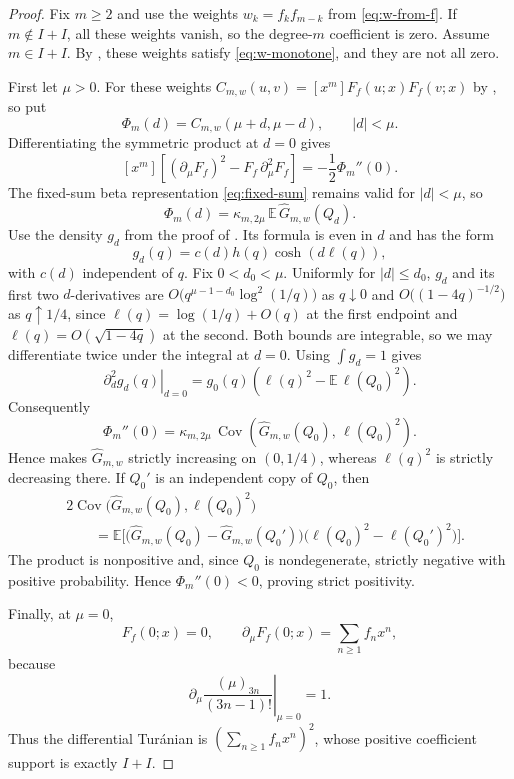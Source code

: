 \documentclass[11pt,a4paper]{amsart}
\numberwithin{equation}{section}
\theoremstyle{plain}
\theoremstyle{definition}
\newcommand{\E}{\mathbb E}
\begin{document}
\begin{proof}
Fix \(m\ge2\) and use the weights \(w_k=f_kf_{m-k}\) from
\eqref{eq:w-from-f}.  If \(m\notin I+I\), all these weights vanish, so the
degree-\(m\) coefficient is zero.  Assume \(m\in I+I\).  By
, these weights satisfy \eqref{eq:w-monotone}, and
they are not all zero.

First let \(\mu>0\).  For these weights
\(C_{m,w}(u,v)=[x^m]F_f(u;x)F_f(v;x)\) by , so put
\[
 \Phi_m(d)=C_{m,w}(\mu+d,\mu-d),
 \qquad |d|<\mu.
\]
Differentiating the symmetric product at \(d=0\) gives
\[
 [x^m]\left[
 (\partial_\mu F_f)^2-F_f\,\partial_\mu^2F_f
 \right]
 =-\frac12\Phi_m''(0).
\]
The fixed-sum beta representation \eqref{eq:fixed-sum} remains valid for
\(|d|<\mu\), so
\[
 \Phi_m(d)=\kappa_{m,2\mu}\,
 \E\,\widehat G_{m,w}(Q_d).
\]
Use the density \(g_d\) from the proof of .  Its formula is
even in \(d\) and has the form
\[
 g_d(q)=c(d)h(q)\cosh(d\ell(q)),
\]
with \(c(d)\) independent of \(q\).  Fix \(0<d_0<\mu\).  Uniformly for
\(|d|\le d_0\), \(g_d\) and its first two \(d\)-derivatives are
\(O\bigl(q^{\mu-1-d_0}\log^2(1/q)\bigr)\) as \(q\downarrow0\) and
\(O\bigl((1-4q)^{-1/2}\bigr)\) as \(q\uparrow1/4\), since
\(\ell(q)=\log(1/q)+O(q)\) at the first endpoint and
\(\ell(q)=O(\sqrt{1-4q})\) at the second.  Both bounds are integrable, so we may
differentiate twice under the integral at \(d=0\).  Using \(\int g_d=1\) gives
\[
 \left.\partial_d^2g_d(q)\right|_{d=0}
 =g_0(q)\left(
 \ell(q)^2-\E\,\ell(Q_0)^2
 \right).
\]
Consequently
\[
 \Phi_m''(0)
 =\kappa_{m,2\mu}\,
 \operatorname{Cov}\!\left(
 \widehat G_{m,w}(Q_0),\,\ell(Q_0)^2
 \right).
\]
Hence  makes \(\widehat G_{m,w}\) strictly increasing on
\((0,1/4)\), whereas
\(\ell(q)^2\) is strictly decreasing there.  If \(Q_0'\) is an independent copy
of \(Q_0\), then
\[
 \begin{split}
 &2\operatorname{Cov}\bigl(
 \widehat G_{m,w}(Q_0),\ell(Q_0)^2
 \bigr)\\
 &\qquad=\E\bigl[
 \bigl(\widehat G_{m,w}(Q_0)-\widehat G_{m,w}(Q_0')\bigr)
 \bigl(\ell(Q_0)^2-\ell(Q_0')^2\bigr)
 \bigr].
 \end{split}
\]
The product is nonpositive and, since \(Q_0\) is nondegenerate, strictly negative
with positive probability.  Hence \(\Phi_m''(0)<0\), proving strict positivity.

Finally, at \(\mu=0\),
\[
 F_f(0;x)=0,\qquad
 \partial_\mu F_f(0;x)=\sum_{n\ge1}f_nx^n,
\]
because
\[
 \left.\partial_\mu
 \frac{(\mu)_{3n}}{(3n-1)!}\right|_{\mu=0}=1.
\]
Thus the differential Tur\'anian is
\((\sum_{n\ge1}f_nx^n)^2\), whose positive coefficient support is exactly
\(I+I\).
\end{proof}
\end{document}
